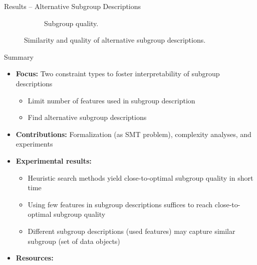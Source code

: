 \documentclass[en, navbaroff, handout]{sdqbeamer}
\begin{document}
\begin{frame}[t]{Results -- Alternative Subgroup Descriptions}
\begin{figure}
\begin{subfigure}[t]{0.4\textwidth}
			\caption{Subgroup quality.}
			\label{fig:csd:alternatives-train-nwracc}
		\end{subfigure}
		\caption*{
			Similarity and quality of alternative subgroup descriptions.
		}
		\label{fig:csd:alternatives:main}
	\end{figure}
\end{frame}

\begin{frame}[t]{Summary}
	\begin{itemize}
		\item \textbf{Focus:} Two constraint types to foster interpretability of subgroup descriptions
		\begin{itemize}
			\item Limit number of features used in subgroup description
			\item Find alternative subgroup descriptions
		\end{itemize}
		\pause
		\vspace{\baselineskip}
		\item \textbf{Contributions:} Formalization (as SMT problem), complexity analyses, and experiments
		\pause
		\vspace{\baselineskip}
		\item \textbf{Experimental results:}
		\begin{itemize}
			\item Heuristic search methods yield close-to-optimal subgroup quality in short time
			\item Using few features in subgroup descriptions suffices to reach close-to-optimal subgroup quality
			\item Different subgroup descriptions (used features) may capture similar subgroup (set of data objects)
		\end{itemize}
		\pause
		\vspace{\baselineskip}
		\item \textbf{Resources:}

\end{itemize}
\end{frame}
\end{document}
